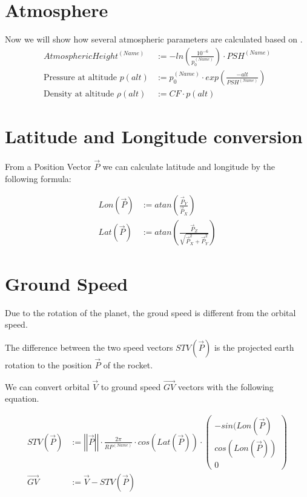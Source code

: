\documentclass[11pt]{article}
\newcommand{\oa}[1]{\overrightarrow{#1}}
\newcommand{\Pos}{\oa{P}}
\newcommand{\Vel}{\oa{V}}
\newcommand{\absvec}[1]{\left|\left|{#1}\right|\right|}
\begin{document}
\section{Atmosphere}

Now we will show how several atmospheric parameters are calculated
based on \cite{Atmo}.
\begin{align}
  AtmosphericHeight^{(Name)} &:= -ln\left(\frac{10^{-6}}{p_0^{(Name)}}\right)\cdot PSH^{(Name)}\\
  \textrm{Pressure at altitude } p(alt) &:= p_0^{(Name)} \cdot exp\left({\frac{-alt}{PSH^{(Name)}}}\right)\\
  \textrm{Density at altitude } \rho(alt) &:= CF \cdot p(alt)
\end{align}

\section{Latitude and Longitude conversion}

From a Position Vector $\Pos$ we can calculate latitude
and longitude by the following formula:

\begin{align}
  Lon(\Pos) &:= atan\left(\frac{\Pos_Y}{\Pos_X}\right)\\
  Lat(\Pos) &:= atan\left(\frac{\Pos_Z}{\sqrt{\Pos_X^2+\Pos_Y^2}}\right)
\end{align}

\section{Ground Speed}

Due to the rotation of the planet, the groud speed is different from
the orbital speed.

The difference between the two speed vectors $STV(\Pos)$ is the
projected earth rotation to the position $\Pos$ of the rocket.

We can convert orbital $\Vel$ to ground speed $\oa{GV}$
vectors with the following equation.

\begin{align}
  STV(\Pos) &:= \absvec{\Pos} \cdot \frac{2 \pi}{RP^{(Name)}} \cdot cos\left(Lat\left(\Pos\right)\right)\cdot\left(\begin{smallmatrix}-sin(Lon(\Pos)\\cos(Lon(\Pos))\\0\end{smallmatrix}\right)\\
  \oa{GV} &:= \Vel - STV(\Pos)
\end{align}
\end{document}
